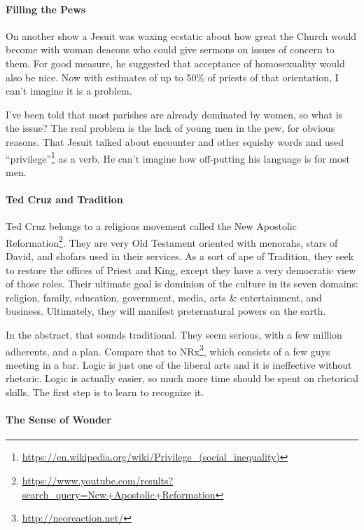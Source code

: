 \paragraph{Filling the Pews}


On another show a Jesuit was waxing ecstatic about how great the Church would become with woman deacons who could give sermons on issues of concern to them. For good measure, he suggested that acceptance of homosexuality would also be nice. Now with estimates of up to 50\% of priests of that orientation, I can't imagine it is a problem.

I've been told that most parishes are already dominated by women, so what is the issue? The real problem is the lack of young men in the pew, for obvious reasons. That Jesuit talked about encounter and other squishy words and used ``privilege''\footnote{\url{https://en.wikipedia.org/wiki/Privilege\_(social\_inequality)}} as a verb. He can't imagine how off-putting his language is for most men.

\paragraph{Ted Cruz and Tradition}


Ted Cruz belongs to a religious movement called the New Apostolic Reformation\footnote{\url{https://www.youtube.com/results?search\_query=New+Apostolic+Reformation}}. They are very Old Testament oriented with menorahs, stars of David, and shofars used in their services. As a sort of ape of Tradition, they seek to restore the offices of Priest and King, except they have a very democratic view of those roles. Their ultimate goal is dominion of the culture in its seven domains: religion, family, education, government, media, arts \& entertainment, and business. Ultimately, they will manifest preternatural powers on the earth.

In the abstract, that sounds traditional. They seem serious, with a few million adherents, and a plan. Compare that to NRx\footnote{\url{http://neoreaction.net/}}, which consists of a few guys meeting in a bar. Logic is just one of the liberal arts and it is ineffective without rhetoric. Logic is actually easier, so much more time should be spent on rhetorical skills. The first step is to learn to recognize it.

\paragraph{The Sense of Wonder}


